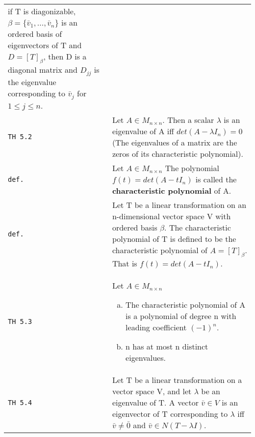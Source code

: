 \documentclass[10pt,landscape]{article}
\begin{document}
\begin{multicols}{3}
\begin{tabular}{@{}p{\the\MyLen}%
                @{}p{\linewidth-\the\MyLen}@{}}
               if T is diagonizable, $\beta = \{\bar{v}_1 ,...,\bar{v}_n\}$ is an ordered basis of eigenvectors of T and $D=[T]_\beta$, then D is a diagonal matrix and $D_{jj}$ is the
               eigenvalue corresponding to $\bar{v}_j$ for $1\leq j \leq n$.\\
\verb!TH 5.2! & Let $A\in M_{n\!\times\! n}$. Then a scalar $\lambda$ is an eigenvalue of A iff $det(A - \lambda I_n) = 0$ (The eigenvalues of a matrix are the zeros of its characteristic
               polynomial).\\
\verb!def.! & Let $A\in M_{n\!\times\! n}$ The polynomial $f(t) = det(A - tI_n)$ is called the \textbf{characteristic polynomial} of A.\\
\verb!def.! & Let T be a linear transformation on an n-dimensional vector space V with ordered basis $\beta$. The characteristic polynomial of T is defined to be the characteristic
             polynomial of $A = [T]_\beta$. That is $f(t) = det(A - tI_n)$.\\
\verb!TH 5.3! & Let $A\in M_{n\!\times\! n}$
               \begin{enumerate}[a)]
               \item The characteristic polynomial of A is a polynomial of degree n with leading coefficient $(-1)^n$.
               \item n has at most n distinct eigenvalues.
               \end{enumerate}\\
\verb!TH 5.4! & Let T be a linear transformation on a vector space V, and let $\lambda$ be an eigenvalue of T. A vector $\bar{v}\in V$ is an eigenvector of T corresponding to $\lambda$
               iff $\bar{v}\neq\bar{0}$ and $\bar{v}\in N(T - \lambda I)$.\\
\end{tabular}

\end{multicols}
\end{document}
